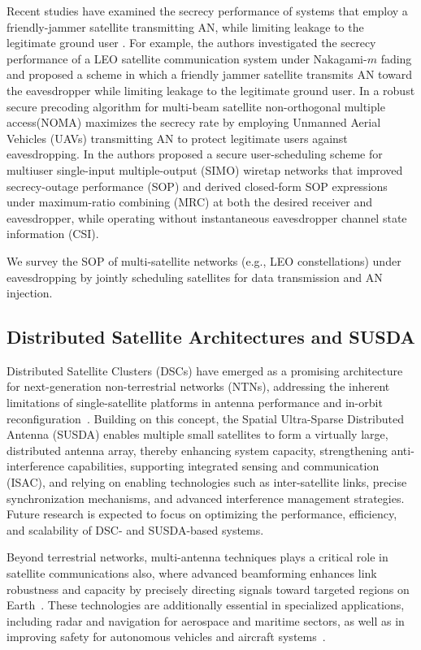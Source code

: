 \documentclass[conference]{IEEEtran}
\begin{document}
Recent studies have examined the secrecy performance of systems that employ a friendly-jammer satellite transmitting AN, while limiting leakage to the legitimate ground user \cite{DNa:25, MHuang:24, IBang:18}. For example, the authors investigated the secrecy performance of a LEO satellite communication system under Nakagami-$m$ fading and proposed a scheme in which a friendly jammer satellite transmits AN toward the eavesdropper while limiting leakage to the legitimate ground user\cite{DNa:25}. In \cite{MHuang:24} a robust secure precoding algorithm for multi-beam satellite non-orthogonal multiple access(NOMA) maximizes the secrecy rate by employing Unmanned Aerial Vehicles (UAVs) transmitting AN to protect legitimate users against eavesdropping. In \cite{IBang:18} the authors proposed a secure user-scheduling scheme for multiuser single-input multiple-output (SIMO) wiretap networks that improved secrecy-outage performance (SOP) and derived closed-form SOP expressions under maximum-ratio combining (MRC) at both the desired receiver and eavesdropper, while operating without instantaneous eavesdropper channel state information (CSI).

We survey the SOP of multi-satellite networks (e.g., LEO constellations) under eavesdropping by jointly scheduling satellites for data transmission and AN injection.

\subsection{Distributed Satellite Architectures and SUSDA} \label{sec2.2}

Distributed Satellite Clusters (DSCs) have emerged as a promising architecture for next-generation non-terrestrial networks (NTNs), addressing the inherent limitations of single-satellite platforms in antenna performance and in-orbit reconfiguration~\cite{PDevi:25}. Building on this concept, the Spatial Ultra-Sparse Distributed Antenna (SUSDA) enables multiple small satellites to form a virtually large, distributed antenna array, thereby enhancing system capacity, strengthening anti-interference capabilities, supporting integrated sensing and communication (ISAC), and relying on enabling technologies such as inter-satellite links, precise synchronization mechanisms, and advanced interference management strategies. Future research is expected to focus on optimizing the performance, efficiency, and scalability of DSC- and SUSDA-based systems.

Beyond terrestrial networks, multi-antenna techniques plays a critical role in satellite communications also, where advanced beamforming enhances link robustness and capacity by precisely directing signals toward targeted regions on Earth~\cite{You:20, Kodheli:20, Heo:23}. These technologies are additionally essential in specialized applications, including radar and navigation for aerospace and maritime sectors, as well as in improving safety for autonomous vehicles and aircraft systems~\cite{Li:07, Li:07_1}.
\end{document}
